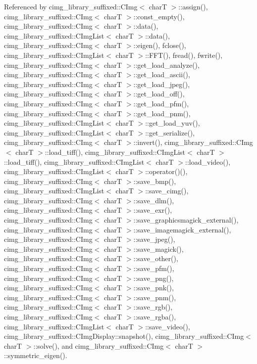 Referenced by cimg\+\_\+library\+\_\+suffixed\+::\+C\+Img$<$ char\+T $>$\+::assign(), cimg\+\_\+library\+\_\+suffixed\+::\+C\+Img$<$ char\+T $>$\+::const\+\_\+empty(), cimg\+\_\+library\+\_\+suffixed\+::\+C\+Img$<$ char\+T $>$\+::data(), cimg\+\_\+library\+\_\+suffixed\+::\+C\+Img\+List$<$ char\+T $>$\+::data(), cimg\+\_\+library\+\_\+suffixed\+::\+C\+Img$<$ char\+T $>$\+::eigen(), fclose(), cimg\+\_\+library\+\_\+suffixed\+::\+C\+Img\+List$<$ char\+T $>$\+::\+F\+F\+T(), fread(), fwrite(), cimg\+\_\+library\+\_\+suffixed\+::\+C\+Img$<$ char\+T $>$\+::get\+\_\+load\+\_\+analyze(), cimg\+\_\+library\+\_\+suffixed\+::\+C\+Img$<$ char\+T $>$\+::get\+\_\+load\+\_\+ascii(), cimg\+\_\+library\+\_\+suffixed\+::\+C\+Img$<$ char\+T $>$\+::get\+\_\+load\+\_\+jpeg(), cimg\+\_\+library\+\_\+suffixed\+::\+C\+Img$<$ char\+T $>$\+::get\+\_\+load\+\_\+off(), cimg\+\_\+library\+\_\+suffixed\+::\+C\+Img$<$ char\+T $>$\+::get\+\_\+load\+\_\+pfm(), cimg\+\_\+library\+\_\+suffixed\+::\+C\+Img$<$ char\+T $>$\+::get\+\_\+load\+\_\+pnm(), cimg\+\_\+library\+\_\+suffixed\+::\+C\+Img\+List$<$ char\+T $>$\+::get\+\_\+load\+\_\+yuv(), cimg\+\_\+library\+\_\+suffixed\+::\+C\+Img\+List$<$ char\+T $>$\+::get\+\_\+serialize(), cimg\+\_\+library\+\_\+suffixed\+::\+C\+Img$<$ char\+T $>$\+::invert(), cimg\+\_\+library\+\_\+suffixed\+::\+C\+Img$<$ char\+T $>$\+::load\+\_\+tiff(), cimg\+\_\+library\+\_\+suffixed\+::\+C\+Img\+List$<$ char\+T $>$\+::load\+\_\+tiff(), cimg\+\_\+library\+\_\+suffixed\+::\+C\+Img\+List$<$ char\+T $>$\+::load\+\_\+video(), cimg\+\_\+library\+\_\+suffixed\+::\+C\+Img\+List$<$ char\+T $>$\+::operator()(), cimg\+\_\+library\+\_\+suffixed\+::\+C\+Img$<$ char\+T $>$\+::save\+\_\+bmp(), cimg\+\_\+library\+\_\+suffixed\+::\+C\+Img\+List$<$ char\+T $>$\+::save\+\_\+cimg(), cimg\+\_\+library\+\_\+suffixed\+::\+C\+Img$<$ char\+T $>$\+::save\+\_\+dlm(), cimg\+\_\+library\+\_\+suffixed\+::\+C\+Img$<$ char\+T $>$\+::save\+\_\+exr(), cimg\+\_\+library\+\_\+suffixed\+::\+C\+Img$<$ char\+T $>$\+::save\+\_\+graphicsmagick\+\_\+external(), cimg\+\_\+library\+\_\+suffixed\+::\+C\+Img$<$ char\+T $>$\+::save\+\_\+imagemagick\+\_\+external(), cimg\+\_\+library\+\_\+suffixed\+::\+C\+Img$<$ char\+T $>$\+::save\+\_\+jpeg(), cimg\+\_\+library\+\_\+suffixed\+::\+C\+Img$<$ char\+T $>$\+::save\+\_\+magick(), cimg\+\_\+library\+\_\+suffixed\+::\+C\+Img$<$ char\+T $>$\+::save\+\_\+other(), cimg\+\_\+library\+\_\+suffixed\+::\+C\+Img$<$ char\+T $>$\+::save\+\_\+pfm(), cimg\+\_\+library\+\_\+suffixed\+::\+C\+Img$<$ char\+T $>$\+::save\+\_\+png(), cimg\+\_\+library\+\_\+suffixed\+::\+C\+Img$<$ char\+T $>$\+::save\+\_\+pnk(), cimg\+\_\+library\+\_\+suffixed\+::\+C\+Img$<$ char\+T $>$\+::save\+\_\+pnm(), cimg\+\_\+library\+\_\+suffixed\+::\+C\+Img$<$ char\+T $>$\+::save\+\_\+rgb(), cimg\+\_\+library\+\_\+suffixed\+::\+C\+Img$<$ char\+T $>$\+::save\+\_\+rgba(), cimg\+\_\+library\+\_\+suffixed\+::\+C\+Img\+List$<$ char\+T $>$\+::save\+\_\+video(), cimg\+\_\+library\+\_\+suffixed\+::\+C\+Img\+Display\+::snapshot(), cimg\+\_\+library\+\_\+suffixed\+::\+C\+Img$<$ char\+T $>$\+::solve(), and cimg\+\_\+library\+\_\+suffixed\+::\+C\+Img$<$ char\+T $>$\+::symmetric\+\_\+eigen().

